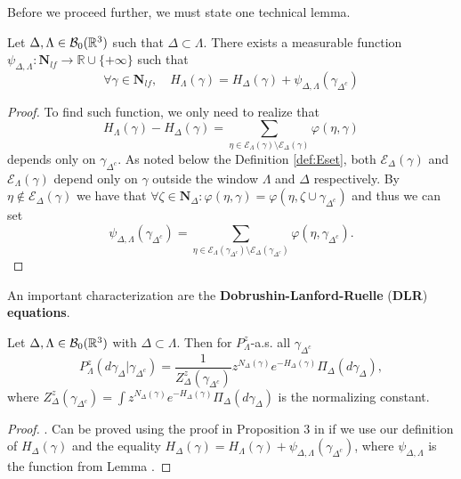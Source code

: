 Before we proceed further, we must state one technical lemma.


\begin{lemma}\label{lemma:DL07}
	Let $\Delta,\Lambda \in \mathcal B_0({\mathbb R^3})$ such that $\Delta \subset \Lambda$. There exists a measurable function $\psi_{\Delta,\Lambda}:\mathbf N_{lf}\to \mathbb R\cup\{+\infty\}$ such that
	$$\forall \gamma \in \mathbf N_{lf},\quad H_\Lambda(\gamma) = H_\Delta(\gamma) + \psi_{\Delta,\Lambda}(\gamma_{\Delta^c})$$
\end{lemma}
\begin{proof}
	To find such function, we only need to realize that
	$$H_\Lambda(\gamma) - H_\Delta(\gamma) = \sum_{\eta \in \mathcal E_\Lambda(\gamma) \setminus \mathcal E_\Delta(\gamma)} \varphi(\eta,\gamma)$$
	depends only on $\gamma_{\Delta^c}$. As noted below the Definition \ref{def:Eset}, both $\mathcal E_\Delta(\gamma)$ and $\mathcal E_\Lambda(\gamma)$ depend only on $\gamma$ outside the window $\Lambda$ and $\Delta$ respectively. By $\eta \notin \mathcal E_{\Delta}(\gamma)$ we have that $\forall \zeta \in \mathbf N_\Delta: \varphi(\eta,\gamma)=\varphi(\eta,\zeta \cup \gamma_{\Delta^c})$ and thus we can set
	$$\psi_{\Delta,\Lambda}(\gamma_{\Delta^c}) = \sum_{\eta \in \mathcal E_\Lambda(\gamma_{\Delta^c}) \setminus \mathcal E_\Delta(\gamma_{\Delta^c})} \varphi(\eta,\gamma_{\Delta^c}).$$
\end{proof}

An important characterization are the \textbf{Dobrushin-Lanford-Ruelle} (\textbf{DLR}) \textbf{equations}.

\begin{proposition}
	Let $\Delta,\Lambda\in \mathcal B_0({\mathbb R^3})$ with $\Delta \subset \Lambda$. Then for $P^z_{\Lambda}$-a.s. all $\gamma_{\Delta^c}$
	$$P^z_{\Lambda}(d\gamma_\Delta|\gamma_{\Delta^c}) = \frac 1{Z^z_\Delta(\gamma_{\Delta^c})} z^{N_\Delta(\gamma)} e^{-H_\Delta(\gamma)} \Pi_\Delta (d\gamma_\Delta),$$
		where $Z^z_{\Delta}(\gamma_{\Delta^c}) = \int z^{N_\Delta(\gamma)} e^{-H_\Delta(\gamma)} \Pi_\Delta(d\gamma_\Delta)$ is the normalizing constant. 
\end{proposition}
\begin{proof}.
	Can be proved using the proof in Proposition $3$ in \cite{Dereudre2017} if we use our definition of $H_\Delta(\gamma)$ and the equality $H_\Delta(\gamma) = H_\Lambda(\gamma) + \psi_{\Delta,\Lambda}(\gamma_{\Delta^c})$, where 
	$\psi_{\Delta,\Lambda}$ is the function from Lemma \label{lemma:DL07}.
\end{proof}

